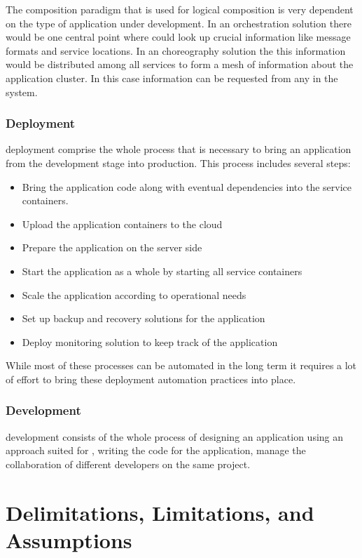 The composition paradigm that is used for logical composition is very dependent
on the type of application under development. In an orchestration solution there
would be one central point where \mss{} could look up crucial information like
message formats and service locations. In an choreography solution the this
information would be distributed among all services to form a mesh of
information about the application cluster. In this case information can be
requested from any \ms{} in the system.

\subsubsection{\ms{} Deployment}

\ms{} deployment comprise the whole process that is necessary to bring an application
from the development stage into production. This process includes several steps: 

\begin{itemize}
  \item Bring the application code along with eventual dependencies into the
  service containers.
  \item Upload the application containers to the cloud
  \item Prepare the application on the server side
  \item Start the application as a whole by starting all service containers
  \item Scale the application according to operational needs
  \item Set up backup and recovery solutions for the application
  \item Deploy monitoring solution to keep track of the application
\end{itemize}

While most of these processes can be automated in the long term it requires a
lot of effort to bring these deployment automation practices into place.

\subsubsection{\ms{} Development}

\ms{} development consists of the whole process of designing an application
using an approach suited for \ms{}, writing the code for the application, manage
the collaboration of different developers on the same project.

\section{Delimitations, Limitations, and Assumptions}

